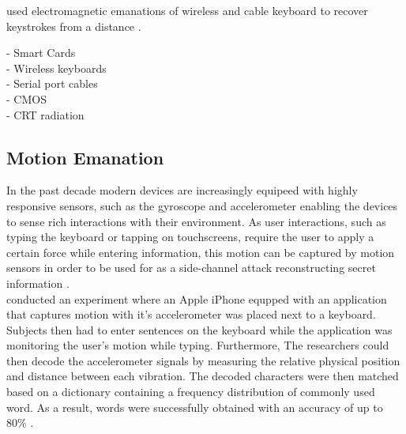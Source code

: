 
\cite{Vuagnoux:2009:CEE:1855768.1855769} used electromagnetic emanations of wireless and cable keyboard to recover keystrokes from a distance \cite{}. 

- Smart Cards \cite{Quisquater:2001:EAM:646803.705980}\\
- Wireless keyboards \cite{Vuagnoux:2009:CEE:1855768.1855769}\\
- Serial port cables \cite{serialcablearticle} \\
- CMOS \cite{Agrawal2003} \\
- CRT radiation \cite{vanEck:1985:ERV:7307.7308}

\subsection{Motion Emanation}
In the past decade modern devices are increasingly equipeed with highly responsive sensors, such as the gyroscope and accelerometer enabling the devices to sense rich interactions with their environment. As user interactions, such as typing the keyboard or tapping on touchscreens, require the user to apply a certain force while entering information, this motion can be captured by motion sensors in order to be used for as a side-channel attack reconstructing secret information \cite{Tapprints,Accessory,Touchlogger}. \\

\citeauthor{Marquardt:2011:IDV:2046707.2046771} conducted an experiment where an Apple iPhone equpped with an application that captures motion with it's accelerometer was placed next to a keyboard. Subjects then had to enter sentences on the keyboard while the application was monitoring the user's motion while typing. Furthermore, The researchers could then decode the accelerometer signals by measuring the relative physical position and distance between each vibration. The decoded characters were then matched based on a dictionary containing a frequency distribution of commonly used word. As a result, words were successfully obtained with an accuracy of up to 80\% \cite{Marquardt:2011:IDV:2046707.2046771}.



